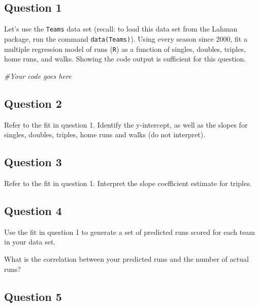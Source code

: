 \documentclass[]{article}
\newenvironment{Shaded}{\begin{snugshade}}{\end{snugshade}}
\newcommand{\CommentTok}[1]{\textcolor[rgb]{0.56,0.35,0.01}{\textit{#1}}}
\begin{document}
\hypertarget{question-1}{%
\subsection{Question 1}\label{question-1}}

Let's use the \texttt{Teams} data set (recall: to load this data set
from the Lahman package, run the command \texttt{data(Teams)}). Using
every season since 2000, fit a multiple regression model of runs
(\texttt{R}) as a function of singles, doubles, triples, home runs, and
walks. Showing the code output is sufficient for this question.

\begin{Shaded}
\begin{Highlighting}[]
\CommentTok{#Your code goes here}
\end{Highlighting}
\end{Shaded}

\hypertarget{question-2}{%
\subsection{Question 2}\label{question-2}}

Refer to the fit in question 1. Identify the y-intercept, as well as the
slopes for singles, doubles, triples, home runs and walks (do not
interpret).

\hypertarget{question-3}{%
\subsection{Question 3}\label{question-3}}

Refer to the fit in question 1. Interpret the slope coefficient estimate
for triples.

\hypertarget{question-4}{%
\subsection{Question 4}\label{question-4}}

Use the fit in question 1 to generate a set of predicted runs scored for
each team in your data set.

What is the correlation between your predicted runs and the number of
actual runs?

\hypertarget{question-5}{%
\subsection{Question 5}\label{question-5}}
\end{document}
